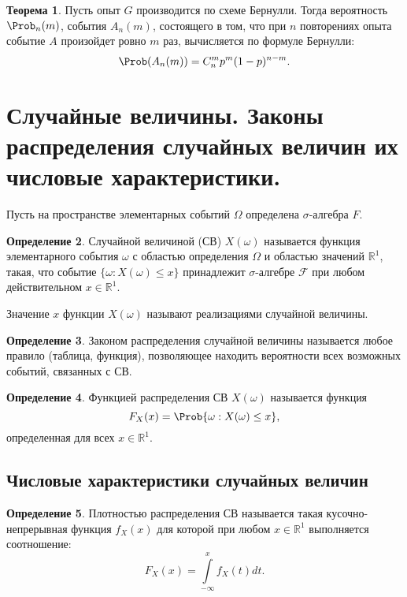 \documentclass[12pt]{report}
\theoremstyle{definition}
\newtheorem{theorem}{Теорема}[chapter]
\newtheorem{definition}[theorem]{Определение}
\newcommand{\R}{\mathbb R}
\newcommand{\F}{\mathcal F}
\begin{document}
\begin{theorem}
Пусть опыт $G$ производится по схеме Бернулли. Тогда вероятность $\Prob_n(m)$,
события $A_n(m)$, состоящего в том, что при $n$ повторениях опыта событие
$A$ произойдет ровно $m$ раз, вычисляется по формуле Бернулли:
$$
\Prob(A_n(m)) = C_n^m p^m (1 - p)^{n-m}.
$$
\end{theorem}



\section
{
  Случайные величины.
  Законы распределения случайных величин их числовые характеристики.
}

Пусть на пространстве элементарных событий $\Omega$ определена $\sigma$-алгебра
$F$.

\begin{definition}
Случайной величиной (СВ) $X(\omega)$ называется функция элементарного
события $\omega$ с областью определения $\Omega$ и областью значений
$\R^1$, такая, что событие $\{\omega : X(\omega) \le x\}$ принадлежит
$\sigma$-алгебре $\F$ при любом действительном $x \in \R^1$.

Значение $x$ функции $X(\omega)$ называют реализациями случайной величины.
\end{definition}

\begin{definition}
Законом распределения случайной величины называется любое правило
(таблица, функция), позволяющее находить вероятности всех возможных событий,
связанных с СВ.
\end{definition}

\begin{definition}
Функцией распределения СВ $X(\omega)$ называется функция
$$
F_X(x) = \Prob\{\omega: X(\omega) \le x \},
$$
определенная для всех $x \in \R^1$.
\end{definition}

\subsection{Числовые характеристики случайных величин}

\begin{definition}
Плотностью распределения СВ называется такая кусочно-непрерывная
функция $f_X(x)$ для которой при любом $x \in \R^1$ выполняется
соотношение:
$$
F_X(x) = \int\limits_{-\infty}^x f_X(t) dt.
$$
\end{definition}
\end{document}
